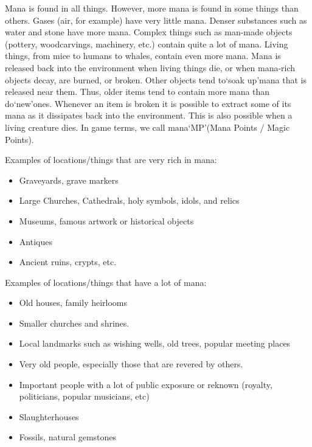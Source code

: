 \documentclass[twoside]{book}
\begin{document}
    {  
    Mana is found in all things. However, more mana is found in some things than others. Gases (air, for example) have very little mana. Denser substances such as water and stone have more mana. Complex things such as man-made objects (pottery, woodcarvings, machinery, etc.) contain quite a lot of mana. Living things, from mice to humans to whales, contain even more mana. Mana is released back into the environment when living things die, or when mana-rich objects decay, are burned, or broken. Other objects tend to`soak up'mana that is released near them. Thus, older items tend to contain more mana than do`new'ones. Whenever an item is broken it is possible to extract some of its mana as it dissipates back into the environment. This is also possible when a living creature dies. In game terms, we call mana`MP'(Mana Points / Magic Points).
    }
  
    {  
    Examples of locations/things that are very rich in mana:
    }
  
\begin{itemize}
      
  \item Graveyards, grave markers
  \item Large Churches, Cathedrals, holy symbols, idols, and relics
  \item Museums, famous artwork or historical objects
  \item Antiques
  \item Ancient ruins, crypts, etc.
\end{itemize}
  
    {  
    Examples of locations/things that have a lot of mana:
    }
  
\begin{itemize}
      
  \item Old houses, family heirlooms
  \item Smaller churches and shrines.
  \item Local landmarks such as wishing wells, old trees, popular meeting places
  \item Very old people, especially those that are revered by others.
  \item Important people with a lot of public exposure or reknown (royalty, politicians, popular musicians, etc)
  \item Slaughterhouses
  \item Fossils, natural gemstones
\end{itemize}
  
\end{document}
